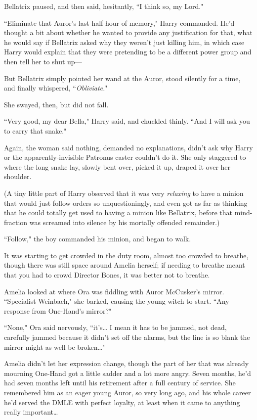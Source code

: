 Bellatrix paused, and then said, hesitantly, ``I think so, my Lord."

``Eliminate that Auror's last half-hour of memory," Harry commanded. He'd thought a bit about whether he wanted to provide any justification for that, what he would say if Bellatrix asked why they weren't just killing him, in which case Harry would explain that they were pretending to be a different power group and then tell her to shut up—

But Bellatrix simply pointed her wand at the Auror, stood silently for a time, and finally whispered, ``\emph{Obliviate.}"

She swayed, then, but did not fall.

``Very good, my dear Bella," Harry said, and chuckled thinly. ``And I will ask you to carry that snake."

Again, the woman said nothing, demanded no explanations, didn't ask why Harry or the apparently-invisible Patronus caster couldn't do it. She only staggered to where the long snake lay, slowly bent over, picked it up, draped it over her shoulder.

(A tiny little part of Harry observed that it was very \emph{relaxing} to have a minion that would just follow orders so unquestioningly, and even got as far as thinking that he could totally get used to having a minion like Bellatrix, before that mind-fraction was screamed into silence by his mortally offended remainder.)

``Follow," the boy commanded his minion, and began to walk.

\later

It was starting to get crowded in the duty room, almost too crowded to breathe, though there was still space around Amelia herself; if needing to breathe meant that you had to crowd Director Bones, it was better not to breathe.

Amelia looked at where Ora was fiddling with Auror McCusker's mirror. ``Specialist Weinbach," she barked, causing the young witch to start. ``Any response from One-Hand's mirror?"

``None," Ora said nervously, ``it's{\ldots} I mean it has to be jammed, not dead, carefully jammed because it didn't set off the alarms, but the line is so blank the mirror might as well be broken{\ldots}"

Amelia didn't let her expression change, though the part of her that was already mourning One-Hand got a little sadder and a lot more angry. Seven months, he'd had seven months left until his retirement after a full century of service. She remembered him as an eager young Auror, so very long ago, and his whole career he'd served the DMLE with perfect loyalty, at least when it came to anything really important{\ldots}

